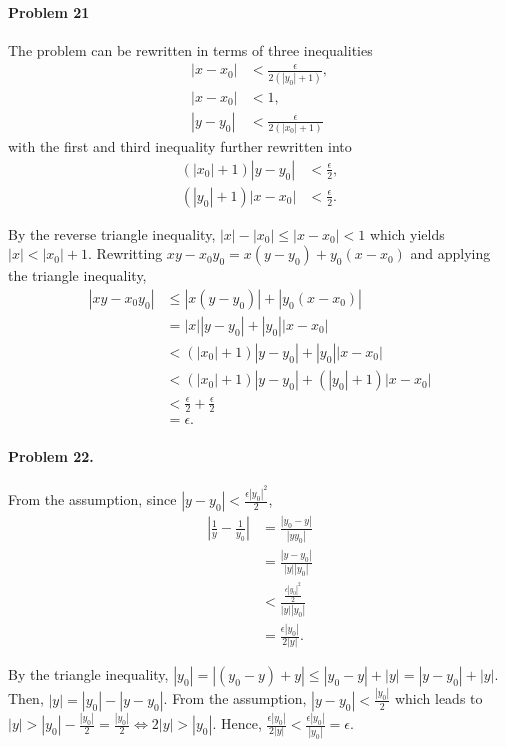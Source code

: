 \documentclass{article}
\begin{document}
\paragraph{Problem 21} The problem can be rewritten in terms of three
inequalities
\begin{align*}
  |x - x_0| &< \frac{\epsilon}{2(|y_0| + 1)}, \\
  |x - x_0| &< 1, \\
  |y - y_0| &< \frac{\epsilon}{2(|x_0| + 1)}
\end{align*}
with the first and third inequality further rewritten into
\begin{align*}
  (|x_0| + 1)|y - y_0| &< \frac{\epsilon}{2}, \\
  (|y_0| + 1)|x - x_0| &< \frac{\epsilon}{2}.
\end{align*}

By the reverse triangle inequality, $|x| - |x_0| \leq |x - x_0| < 1$ which
yields $|x| < |x_0| + 1$. Rewritting $xy - x_0y_0 = x(y - y_0) + y_0(x - x_0)$
and applying the triangle inequality,
\begin{align*}
  |xy - x_0y_0| &\leq |x(y - y_0)| + |y_0(x - x_0)| \\
    &= |x||y - y_0| + |y_0||x - x_0| \\
    &< (|x_0| + 1)|y - y_0| + |y_0||x - x_0| \\
    &< (|x_0| + 1)|y - y_0| + (|y_0| + 1)|x - x_0| \\
    &< \frac{\epsilon}{2} + \frac{\epsilon}{2} \\
    &= \epsilon.
\end{align*}

\paragraph{Problem 22.} From the assumption, since $|y - y_0| <
\frac{\epsilon|y_0|^2}{2}$,
\begin{align*}
  \left| \frac{1}{y} - \frac{1}{y_0} \right| &= \frac{|y_0 - y|}{|yy_0|} \\
    &= \frac{|y - y_0|}{|y||y_0|} \\
    &< \frac{\frac{\epsilon|y_0|^2}{2}}{|y||y_0|} \\
    &= \frac{\epsilon|y_0|}{2|y|}.
\end{align*}

By the triangle inequality, $|y_0| = |(y_0 - y) + y| \leq |y_0 - y| + |y| = |y
- y_0| + |y|$. Then, $|y| = |y_0| - |y - y_0|$. From the assumption, $|y - y_0|
< \frac{|y_0|}{2}$ which leads to $|y| > |y_0| - \frac{|y_0|}{2} =
\frac{|y_0|}{2} \iff 2|y| > |y_0|$. Hence, $\frac{\epsilon|y_0|}{2|y|} <
\frac{\epsilon|y_0|}{|y_0|} = \epsilon$.
\end{document}
